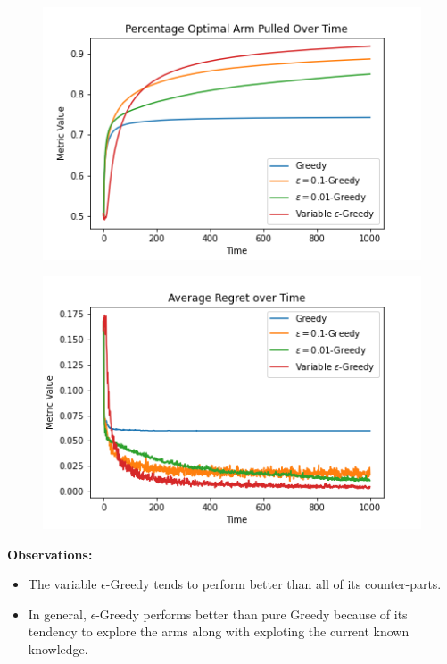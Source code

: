 \documentclass{article}
\begin{document}
		\begin{figure}[H]
		\graphicspath{ {../Experiments/Bernoulli_2_Greedy/} }
		\centering
		\begin{minipage}{.5\textwidth}
		  \centering
		  \includegraphics[width=\linewidth]{Percentage_Optimal_Arm_Pulled_Over_Time.png}
		  \label{fig:test1}
		\end{minipage}%
		\begin{minipage}{.5\textwidth}
		  \centering
		  \includegraphics[width=\linewidth]{Average_Regret_over_Time.png}
		  \label{fig:test2}
		\end{minipage}
		\end{figure}
		
		\textbf{Observations:}
		\begin{itemize}
			\item The variable $\epsilon$-Greedy tends to perform better than all of its counter-parts.
			\item In general, $\epsilon$-Greedy performs better than pure Greedy because of its tendency to explore the arms along with exploting the current 
				known knowledge.
		\end{itemize}
		
\end{document}
